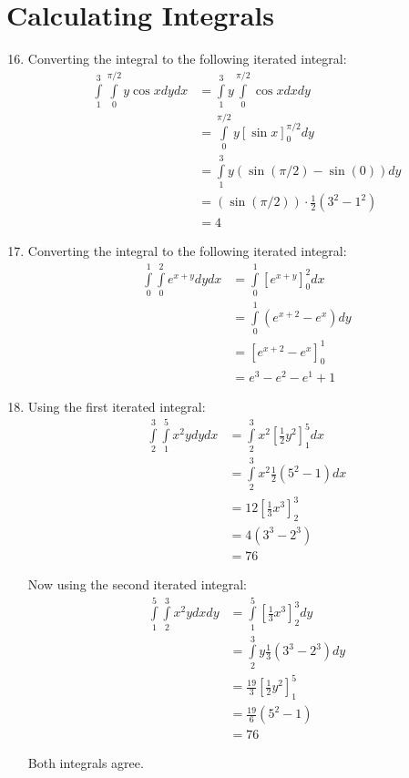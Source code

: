 \documentclass{article}
\begin{document}
\section{Calculating Integrals}

\begin{enumerate}[1.]
  \setcounter{enumi}{15}
  \item Converting the integral to the following iterated integral:
    \begin{align*}
      \int\limits_{1}^{3}\int\limits_{0}^{\pi/2} y \cos x dy dx &=
      \int\limits_{1}^{3}y\int\limits_{0}^{\pi/2} \cos x dx dy \\
      &= \int\limits_{0}^{\pi/2}y \left[ \sin x \right]_{0}^{\pi/2} dy \\
      &= \int\limits_{1}^{3}y (\sin (\pi/2) - \sin (0) ) dy \\
      &= (\sin (\pi/2)) \cdot \frac{ 1 }{ 2 }\left( 3^{2} - 1^{2} \right) \\
      &=  4
    \end{align*}
  \item Converting the integral to the following iterated integral:
    \begin{align*}
      \int\limits_0^{1}\int\limits_0^{2}e^{x+y}dydx &= \int\limits_0^{1}\left[
      e^{x+y} \right]_{0}^{2}dx \\
      &= \int \limits_0^{1} (e^{x+2} - e^{x}) dy \\
      &= \left[ e^{x+2} - e^{x} \right]_{0}^{1} \\
      &= e^{3} - e^{2} - e^{1} + 1
    \end{align*}
  \item Using the first iterated integral:
    \begin{align*}
      \int\limits_2^{3}\int\limits_1^{5} x^{2} y dy dx &= \int\limits_2^{3} x^{2}
      \left[ \frac{ 1 }{ 2 } y^{2} \right]_1^{5} dx \\
      &= \int\limits_2^{3}x^{2} \frac{ 1 }{ 2 } (5^{2} - 1) dx \\
      &= 12 \left[ \frac{ 1 }{ 3 } x^{3} \right]_2^{3} \\
      &= 4 (3^{3} - 2^{3}) \\
      &= 76
    \end{align*}

    Now using the second iterated integral:
    \begin{align*}
       \int\limits_1^{5}\int\limits_2^{3} x^{2} y dx dy &= \int\limits_1^{5}
       \left[ \frac{ 1 }{ 3 } x^{3} \right]_2^{3} dy \\
       &= \int\limits_2^{3}y \frac{ 1 }{ 3 } (3^{3} - 2^{3}) dy \\
       &= \frac{ 19 }{ 3 } \left[ \frac{ 1 }{ 2 } y^{2} \right]_1^{5} \\
       &= \frac{ 19 }{ 6 } (5^{2} - 1) \\
       &= 76
    \end{align*}

    Both integrals agree.
\end{enumerate}
\end{document}
